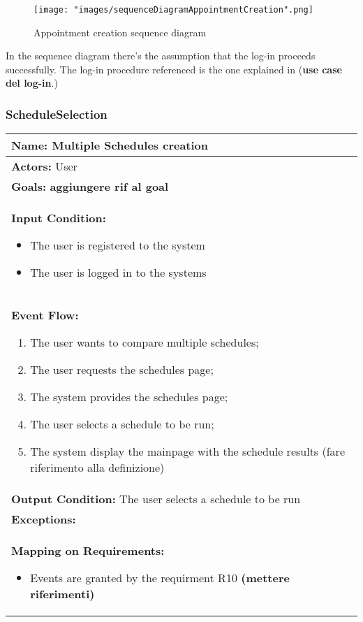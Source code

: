 \begin{figure}[H]
\begin{center}
\texttt{[image: "images/sequenceDiagramAppointmentCreation".png]}
\caption{Appointment creation sequence diagram}
\label{img:seqDiagrAppCreation}
\end{center}
\end{figure}

In the sequence diagram there's the assumption that the log-in proceeds successfully. The log-in procedure referenced is the one explained in (\textbf{use case del log-in}.)

\subsubsection{ScheduleSelection}
\begin{longtable}{|p{14cm}|} \hline
\textbf{Name:} Multiple Schedules creation \\ \hline
\textbf{Actors:} User \\ \hline
\textbf{Goals:} \textbf{aggiungere rif al goal} \\ \hline
\textbf{Input Condition:} 
\begin{itemize}
\item The user is registered to the system 
\item The user is logged in to the systems 
\end{itemize}
\\ \hline
\textbf{Event Flow:}
\begin{enumerate}
\item The user wants to compare multiple schedules;
\item The user requests the schedules page;
\item The system provides the schedules page;
\item The user selects a schedule to be run;
\item The system display the mainpage with the schedule results (fare riferimento alla definizione)
\end{enumerate}	\\ \hline
\textbf{Output Condition:} The user selects a schedule to be run \\ \hline
\textbf{Exceptions:}
\\ \hline
\textbf{Mapping on Requirements:}
\begin{itemize}
\item Events are granted by the requirment R10 \textbf{(mettere riferimenti)}
\end{itemize}  \\ \hline

\end{longtable}
\label{usecase:ScheduleSelection}


